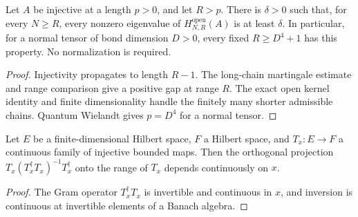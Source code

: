 \begin{lemma}
    \label{thm:normal_open_gap_every_sufficient_range}
    \leanok
    Let $A$ be injective at a length $p>0$, and let $R>p$. There is
    $\delta>0$ such that, for every $N\geq R$, every nonzero eigenvalue of
    $H^{\mathrm{open}}_{N,R}(A)$ is at least $\delta$.
    In particular, for a normal tensor of bond dimension $D>0$, every
    fixed $R\geq D^4+1$ has this property. No normalization is required.
\end{lemma}

\begin{proof}
    \leanok
    Injectivity propagates to length $R-1$. The long-chain martingale
    estimate and range comparison give a positive gap at range $R$.
    The exact open kernel identity and finite dimensionality handle the
    finitely many shorter admissible chains. Quantum Wielandt gives
    $p=D^4$ for a normal tensor.
\end{proof}

\begin{lemma}
    \label{thm:continuous_injective_range_projector}
    \leanok
    Let $E$ be a finite-dimensional Hilbert space, $F$ a Hilbert space, and
    $T_x\colon E\to F$ a continuous family of injective bounded maps. Then the orthogonal projection
    $T_x(T_x^\dagger T_x)^{-1}T_x^\dagger$ onto the range of $T_x$ depends
    continuously on $x$.
\end{lemma}

\begin{proof}
    \leanok
    The Gram operator $T_x^\dagger T_x$ is invertible and continuous in $x$,
    and inversion is continuous at invertible elements of a Banach algebra.
\end{proof}

